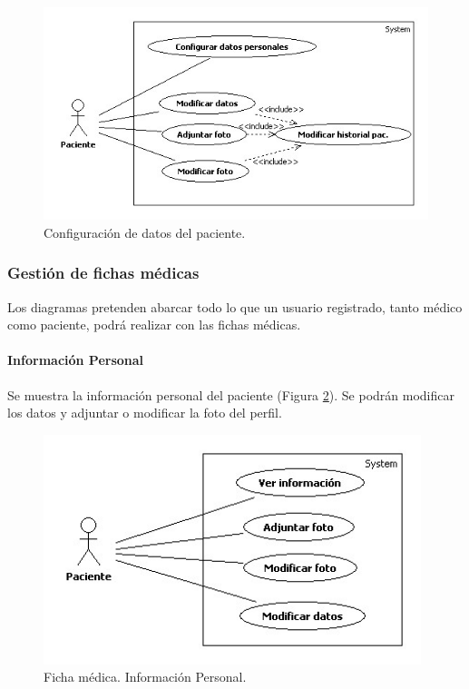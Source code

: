 				\begin{figure}[H]
				  \centering
				    \includegraphics[width=12cm]{img/jpg/casos_uso/Datos.jpg}
				  \caption{Configuración de datos del paciente.}
				  \label{fig:datos_pac}
				\end{figure}
			
		
	
		\subsubsection{Gestión de fichas médicas} %
		\label{sec:gestion_de_fichas_medicas}
			
			Los diagramas pretenden abarcar todo lo que un usuario registrado, tanto médico como paciente, podrá realizar con las fichas médicas.
			\paragraph{Información Personal} %
			\label{par:informacion_personal}
				Se muestra la información personal del paciente (Figura \ref{fig:infpers_fic}). Se podrán modificar los datos y adjuntar o modificar la foto del perfil.
				\begin{figure}[H]
				  \centering
				    \includegraphics[width=11cm]{img/jpg/casos_uso/Informacion_personal.jpg}
				  \caption{Ficha médica. Información Personal.}
				  \label{fig:infpers_fic}
				\end{figure}
		
